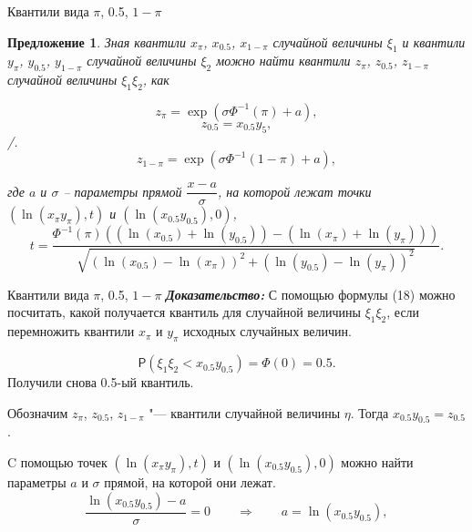 \documentclass[ucs, notheorems, handout]{beamer}
\newtheorem{proposition}[theorem]{Предложение}
\begin{document}
	\begin{frame}{Квантили вида $\pi$, 0.5, $1-\pi$}
	
		\begin{proposition}
		Зная квантили $x_{\pi}$, $x_{0.5}$, $x_{1-\pi}$ случайной величины $\xi_{1}$ и квантили $y_{\pi}$, $y_{0.5}$, $y_{1-\pi}$ случайной величины $\xi_{2}$ можно найти квантили $z_{\pi}$, $z_{0.5}$, $z_{1-\pi}$ случайной величины $\xi_{1}\xi_{2}$, как
		
		\begin{equation*}
			z_{\pi}=\exp(\sigma\Phi^{-1}(\pi)+a),
		\end{equation*}
		\begin{equation*}
			z_{0.5}=x_{0.5}y_{5},
		\end{equation*}/.
		\begin{equation*}
			z_{1-\pi}=\exp(\sigma\Phi^{-1}(1-\pi)+a),
		\end{equation*}
		
		где $a$ и $\sigma$ -- параметры прямой $\dfrac{x-a}{\sigma}$, на которой лежат точки $(\ln(x_{\pi}y_{\pi}), t)$ и $(\ln(x_{0.5}y_{0.5}),0)$,
		\begin{equation*}
			t = \frac{\Phi^{-1}(\pi)((\ln(x_{0.5})+\ln(y_{0.5}))-(\ln(x_{\pi})+\ln(y_{\pi})))}{\sqrt{(\ln(x_{0.5})-\ln(x_{\pi}))^{2}+(\ln(y_{0.5})-\ln(y_{\pi}))^{2}}}. 
		\end{equation*}
	\end{proposition}
\end{frame}

\begin{frame}{Квантили вида $\pi$, 0.5, $1-\pi$}
	\textbf{\textit{Доказательство:}}
	С помощью формулы (18) можно посчитать, какой получается квантиль для случайной величины $\xi_{1}\xi_{2}$, если перемножить квантили $x_{\pi}$ и $y_{\pi}$ исходных случайных величин.
	
	\begin{equation*}
		\mathsf{P}(\xi_{1} \xi_{2} < x_{0.5}y_{0.5}) = \Phi(0) = 0.5.
	\end{equation*}
	Получили снова 0.5-ый квантиль. 
	
	Обозначим $z_{\pi}$, $z_{0.5}$, $z_{1-\pi}$ "--- квантили случайной величины $\eta$.
	Тогда $x_{0.5}y_{0.5} = z_{0.5}$.
	
	C помощью точек $(\ln(x_{\pi}y_{\pi}), t)$ и $(\ln(x_{0.5}y_{0.5}),0)$  можно найти параметры $a$ и $\sigma$ прямой, на которой они лежат.
	\begin{equation*}
		\dfrac{\ln(x_{0.5}y_{0.5})-a}{\sigma}=0 \quad\quad \Rightarrow \quad\quad a=\ln(x_{0.5}y_{0.5}),
	\end{equation*}
	
\end{frame}
\end{document}

